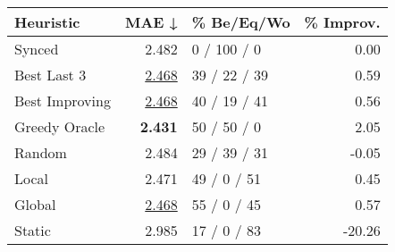 \begin{tabular}{lrlr}
\toprule
\textbf{Heuristic} & \textbf{MAE ↓} & \textbf{\% Be/Eq/Wo} & \textbf{\% Improv.} \\
\midrule
            Synced &          2.482 &          0 / 100 / 0 &                0.00 \\
\midrule
       Best Last 3 &          \underline{2.468} &         39 / 22 / 39 &                0.59 \\
    Best Improving &          \underline{2.468} &         40 / 19 / 41 &                0.56 \\
\addlinespace
     Greedy Oracle &          \textbf{2.431} &          50 / 50 / 0 &                2.05 \\
            Random &          2.484 &         29 / 39 / 31 &               -0.05 \\
\midrule
             Local &          2.471 &          49 / 0 / 51 &                0.45 \\
            Global &          \underline{2.468} &          55 / 0 / 45 &                0.57 \\
\midrule
            Static &          2.985 &          17 / 0 / 83 &              -20.26 \\
\bottomrule
\end{tabular}

\label{tab:hr_non_lr01_le2_bs4_Summary}
